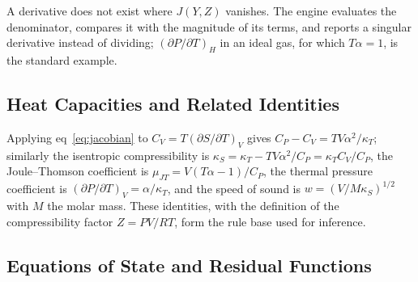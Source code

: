 \documentclass[journal=iecred,manuscript=article,layout=twocolumn]{achemso}
\begin{document}
A derivative does not exist where $J(Y,Z)$ vanishes. The engine evaluates the
denominator, compares it with the magnitude of its terms, and reports a
singular derivative instead of dividing; $(\partial P/\partial T)_H$ in an ideal
gas, for which $T\alpha = 1$, is the standard example.

\subsection{Heat Capacities and Related Identities}

Applying eq~\ref{eq:jacobian} to $C_V = T(\partial S/\partial T)_V$ gives
$C_P - C_V = TV\alpha^2/\kappa_T$; similarly the isentropic compressibility is
$\kappa_S = \kappa_T - TV\alpha^2/C_P = \kappa_T C_V/C_P$, the Joule--Thomson
coefficient is $\mu_{JT} = V(T\alpha - 1)/C_P$, the thermal pressure coefficient
is $(\partial P/\partial T)_V = \alpha/\kappa_T$, and the speed of sound is
$w = (V/M\kappa_S)^{1/2}$ with $M$ the molar mass. These identities, with the
definition of the compressibility factor $Z = PV/RT$, form the rule base used
for inference.

\subsection{Equations of State and Residual Functions}
\end{document}
